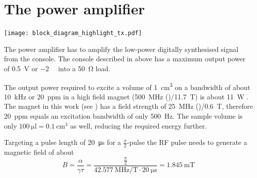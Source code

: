 
\section{The power amplifier}
\begin{marginfigure}[-4.5\baselineskip]
    \texttt{[image: block\_diagram\_highlight\_tx.pdf]}
\end{marginfigure}

The power amplifier has to amplify the low-power digitally synthesised signal from the console. The console described in  above has a maximum output power of \qty{0.5}{\volt} or \qty{-2}{\deci\belm} into a \qty{50}{\ohm} load.

The output power required to excite a volume of \qty{1}{\centi\meter\cubed} on a bandwidth of about \qty{10}{\kilo\hertz} or \qty{20}{ppm} in a high field magnet (\qty{500}{\mega\hertz} ()/\qty{11.7}{\tesla}) is about \qty{11}{\watt} . The magnet in this work (see ) has a field strength of \qty{25}{\mega\hertz} ()/\qty{0.6}{\tesla}, therefore \qty{20}{ppm} equals an excitation bandwidth of only \qty{500}{\hertz}. The sample volume is only \(\qty{100}{\micro\litre} = \qty{0.1}{\centi\meter\cubed}\) as well, reducing the required energy further.

Targeting a pulse length of \qty{20}{\micro\second} for a  \(\frac{\pi}{2}\)-pulse the RF pulse needs to generate a magnetic field of about
\[
    B = \frac{\alpha}{\gamma\tau} = \frac{\frac{\pi}{2}}{\qty{42.577}{\mega\hertz\per\tesla}\cdot{}\qty{20}{\micro\second}} = \qty{1.845}{\milli\tesla}
\]

